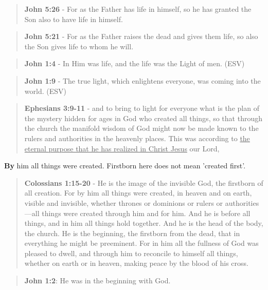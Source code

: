 \documentclass[11pt]{article}
\begin{document}
\begin{quote}
\textbf{John 5:26} - For as the Father has life in himself, so he has granted the Son also to have life in himself.
\end{quote}

\begin{quote}
\textbf{John 5:21} - For as the Father raises the dead and gives them life, so also the Son gives life to whom he will.
\end{quote}

\begin{quote}
\textbf{John 1:4} - In Him was life, and the life was the Light of men. (ESV)
\end{quote}

\begin{quote}
\textbf{John 1:9} - The true light, which enlightens everyone, was coming into the world. (ESV)
\end{quote}

\begin{quote}
\textbf{Ephesians 3:9-11} - and to bring to light for everyone what is the plan of the mystery hidden for ages in God who created all things, so that through the church the manifold wisdom of God might now be made known to the rulers and authorities in the heavenly places. This was according to \uline{the eternal purpose that he has realized in Christ Jesus} our Lord,
\end{quote}

\textbf{By} him all things were created. Firstborn here does not mean 'created first'.

\begin{quote}
\textbf{Colossians 1:15-20} - He is the image of the invisible God, the firstborn of all creation. For by him all things were created, in heaven and on earth, visible and invisible, whether thrones or dominions or rulers or authorities—all things were created through him and for him. And he is before all things, and in him all things hold together. And he is the head of the body, the church. He is the beginning, the firstborn from the dead, that in everything he might be preeminent. For in him all the fullness of God was pleased to dwell, and through him to reconcile to himself all things, whether on earth or in heaven, making peace by the blood of his cross.
\end{quote}

\begin{quote}
\textbf{John 1:2}: He was in the beginning with God.
\end{quote}
\end{document}
